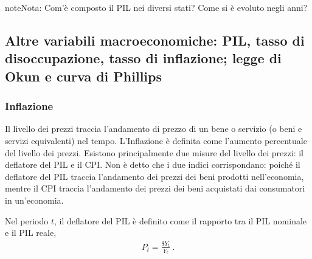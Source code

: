 \documentclass[letterpaper,10pt,italian]{jupyterBook}
\begin{document}
\begin{sphinxadmonition}{note}{Nota:}
\sphinxAtStartPar
Com’è composto il PIL nei diversi stati? Come si è evoluto negli anni?
\end{sphinxadmonition}


\subsection{Altre variabili macroeconomiche: PIL, tasso di disoccupazione, tasso di inflazione; legge di Okun e curva di Phillips}
\label{\detokenize{ch/macro:altre-variabili-macroeconomiche-pil-tasso-di-disoccupazione-tasso-di-inflazione-legge-di-okun-e-curva-di-phillips}}\label{\detokenize{ch/macro:economics-hs-macro-intro-macro-vars}}

\subsubsection{Inflazione}
\label{\detokenize{ch/macro:inflazione}}\label{\detokenize{ch/macro:economics-hs-macro-intro-macro-vars-inflation}}
\sphinxAtStartPar
{} Il livello dei prezzi traccia l’andamento di prezzo di un bene o servizio (o beni e servizi equivalenti) nel tempo. L’Inflazione è definita come l’aumento percentuale del livello dei prezzi. Esistono principalmente due misure del livello dei prezzi: il deflatore del PIL e il CPI. Non è detto che i due indici corrispondano: poiché il deflatore del PIL traccia l’andamento dei prezzi dei beni prodotti nell’economia, mentre il CPI traccia l’andamento dei prezzi dei beni acquistati dai consumatori in un’economia.

\sphinxAtStartPar
{} Nel periodo \(t\), il deflatore del PIL è definito come il rapporto tra il PIL nominale e il PIL reale,
\begin{equation*}
\begin{split}P_t = \frac{\$ Y_t}{Y_t} \ .\end{split}
\end{equation*}
\sphinxAtStartPar
{}
\end{document}
